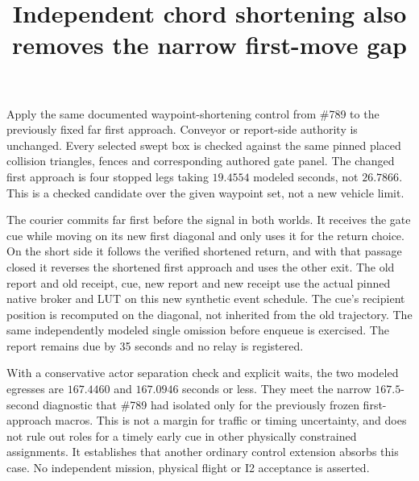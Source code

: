 \documentclass{article}
\begin{document}
\title{Independent chord shortening also removes the narrow first-move gap}
\maketitle

Apply the same documented waypoint-shortening control from
\#789 to the previously fixed far first approach. Conveyor or
report-side authority is unchanged. Every selected swept box
is checked against the same pinned placed collision triangles,
fences and corresponding authored gate panel. The changed
first approach is four stopped legs taking \(19.4554\) modeled
seconds, not \(26.7866\). This is a checked candidate over the
given waypoint set, not a new vehicle limit.

The courier commits far first before the signal in both worlds.
It receives the gate cue while moving on its new first diagonal
and only uses it for the return choice. On the short side
it follows the verified shortened return, and with that passage
closed it reverses the shortened first approach and uses the
other exit. The old report and old receipt, cue, new report and
new receipt use the actual pinned native broker and LUT on this
new synthetic event schedule. The cue's recipient position is
recomputed on the diagonal, not inherited from the old trajectory.
The same independently modeled single omission before enqueue
is exercised. The report remains due by 35 seconds and
no relay is registered.

With a conservative actor separation check and explicit waits,
the two modeled egresses are \(167.4460\) and \(167.0946\)
seconds or less. They meet the narrow \(167.5\)-second
diagnostic that \#789 had isolated only for the previously
frozen first-approach macros. This is not a margin for traffic or
timing uncertainty, and does not rule out roles for a timely early
cue in other physically constrained assignments.
It establishes that another ordinary control extension absorbs
this case. No independent mission, physical flight or I2 acceptance
is asserted.
\end{document}
